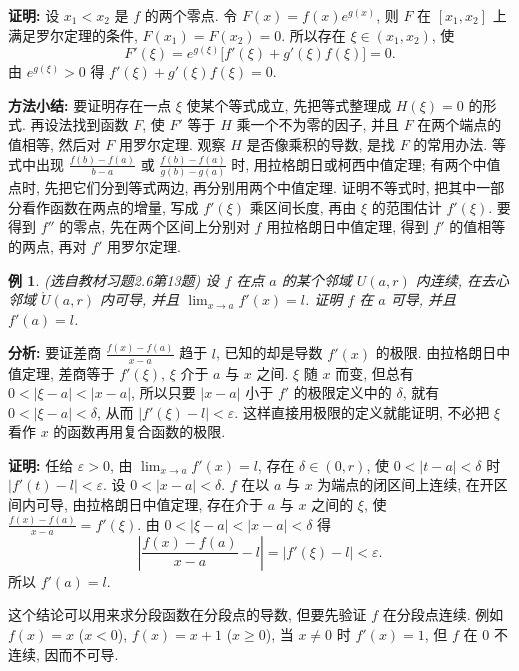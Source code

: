 \documentclass[UTF8,openany]{ctexbook}
\theoremstyle{chinesetextbook}
\newtheorem{example}{例}[section]
\newenvironment{cnproof}{\par\indent\textbf{证明:} \ignorespaces}{\par}
\begin{document}
\begin{cnproof}
设 $x_1<x_2$ 是 $f$ 的两个零点. 令 $F(x)=f(x)e^{g(x)}$, 则 $F$ 在 $[x_1,x_2]$ 上满足罗尔定理的条件, $F(x_1)=F(x_2)=0$. 所以存在 $\xi\in(x_1,x_2)$, 使
\[
F'(\xi)=e^{g(\xi)}\bigl[f'(\xi)+g'(\xi)f(\xi)\bigr]=0.
\]
由 $e^{g(\xi)}>0$ 得 $f'(\xi)+g'(\xi)f(\xi)=0$.
\end{cnproof}
\par\indent\textbf{方法小结:} 要证明存在一点 $\xi$ 使某个等式成立, 先把等式整理成 $H(\xi)=0$ 的形式. 再设法找到函数 $F$, 使 $F'$ 等于 $H$ 乘一个不为零的因子, 并且 $F$ 在两个端点的值相等, 然后对 $F$ 用罗尔定理. 观察 $H$ 是否像乘积的导数, 是找 $F$ 的常用办法. 等式中出现 $\displaystyle\frac{f(b)-f(a)}{b-a}$ 或 $\displaystyle\frac{f(b)-f(a)}{g(b)-g(a)}$ 时, 用拉格朗日或柯西中值定理; 有两个中值点时, 先把它们分到等式两边, 再分别用两个中值定理. 证明不等式时, 把其中一部分看作函数在两点的增量, 写成 $f'(\xi)$ 乘区间长度, 再由 $\xi$ 的范围估计 $f'(\xi)$. 要得到 $f''$ 的零点, 先在两个区间上分别对 $f$ 用拉格朗日中值定理, 得到 $f'$ 的值相等的两点, 再对 $f'$ 用罗尔定理.
\begin{example}\label{ex:c2-h6-13}
\textnormal{(选自教材习题2.6第13题)} 设 $f$ 在点 $a$ 的某个邻域 $U(a,r)$ 内连续, 在去心邻域 $\mathring U(a,r)$ 内可导, 并且 $\displaystyle\lim_{x\to a}f'(x)=l$. 证明 $f$ 在 $a$ 可导, 并且 $f'(a)=l$.
\end{example}
\par\indent\textbf{分析:} 要证差商 $\displaystyle\frac{f(x)-f(a)}{x-a}$ 趋于 $l$, 已知的却是导数 $f'(x)$ 的极限. 由拉格朗日中值定理, 差商等于 $f'(\xi)$, $\xi$ 介于 $a$ 与 $x$ 之间. $\xi$ 随 $x$ 而变, 但总有 $0<|\xi-a|<|x-a|$, 所以只要 $|x-a|$ 小于 $f'$ 的极限定义中的 $\delta$, 就有 $0<|\xi-a|<\delta$, 从而 $|f'(\xi)-l|<\varepsilon$. 这样直接用极限的定义就能证明, 不必把 $\xi$ 看作 $x$ 的函数再用复合函数的极限.
\begin{cnproof}
任给 $\varepsilon>0$, 由 $\displaystyle\lim_{x\to a}f'(x)=l$, 存在 $\delta\in(0,r)$, 使 $0<|t-a|<\delta$ 时 $|f'(t)-l|<\varepsilon$. 设 $0<|x-a|<\delta$. $f$ 在以 $a$ 与 $x$ 为端点的闭区间上连续, 在开区间内可导, 由拉格朗日中值定理, 存在介于 $a$ 与 $x$ 之间的 $\xi$, 使 $\displaystyle\frac{f(x)-f(a)}{x-a}=f'(\xi)$. 由 $0<|\xi-a|<|x-a|<\delta$ 得
\[
\left|\frac{f(x)-f(a)}{x-a}-l\right|=|f'(\xi)-l|<\varepsilon.
\]
所以 $f'(a)=l$.
\end{cnproof}
这个结论可以用来求分段函数在分段点的导数, 但要先验证 $f$ 在分段点连续. 例如 $f(x)=x$ ($x<0$), $f(x)=x+1$ ($x\ge0$), 当 $x\ne0$ 时 $f'(x)=1$, 但 $f$ 在 $0$ 不连续, 因而不可导.
\end{document}
